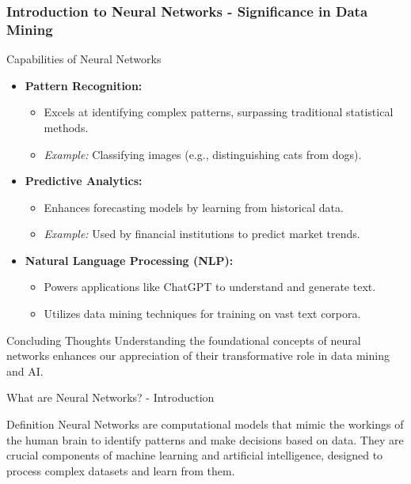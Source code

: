 \documentclass[aspectratio=169]{beamer}
\begin{document}
\begin{frame}[fragile]
    \frametitle{Introduction to Neural Networks - Significance in Data Mining}
    \begin{block}{Capabilities of Neural Networks}
        \begin{itemize}
            \item \textbf{Pattern Recognition:}
            \begin{itemize}
                \item Excels at identifying complex patterns, surpassing traditional statistical methods. 
                \item \textit{Example:} Classifying images (e.g., distinguishing cats from dogs).
            \end{itemize}
            
            \item \textbf{Predictive Analytics:}
            \begin{itemize}
                \item Enhances forecasting models by learning from historical data.
                \item \textit{Example:} Used by financial institutions to predict market trends.
            \end{itemize}
            
            \item \textbf{Natural Language Processing (NLP):}
            \begin{itemize}
                \item Powers applications like ChatGPT to understand and generate text.
                \item Utilizes data mining techniques for training on vast text corpora.
            \end{itemize}
        \end{itemize}
    \end{block}

    \begin{block}{Concluding Thoughts}
        Understanding the foundational concepts of neural networks enhances our appreciation of their transformative role in data mining and AI.
    \end{block}
\end{frame}

\begin{frame}[fragile]{What are Neural Networks? - Introduction}
    \begin{block}{Definition}
        Neural Networks are computational models that mimic the workings of the human brain to identify patterns and make decisions based on data. They are crucial components of machine learning and artificial intelligence, designed to process complex datasets and learn from them.
    \end{block}
\end{frame}
\end{document}
